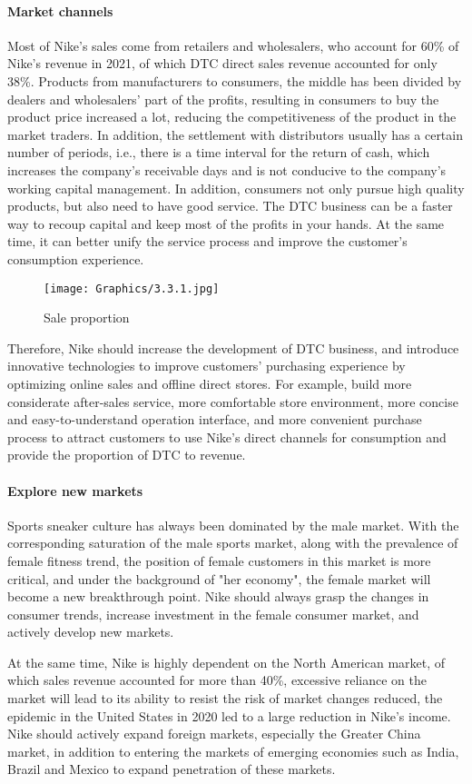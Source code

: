 \documentclass[a4paper, 12pt]{report}
\begin{document}
\paragraph{Market channels}
Most of Nike's sales come from retailers and wholesalers, who account for 60\% of Nike's revenue in 2021, of which DTC direct sales revenue accounted for only 38\%. Products from manufacturers to consumers, the middle has been divided by dealers and wholesalers’ part of the profits, resulting in consumers to buy the product price increased a lot, reducing the competitiveness of the product in the market traders. In addition, the settlement with distributors usually has a certain number of periods, i.e., there is a time interval for the return of cash, which increases the company's receivable days and is not conducive to the company's working capital management. In addition, consumers not only pursue high quality products, but also need to have good service. The DTC business can be a faster way to recoup capital and keep most of the profits in your hands. At the same time, it can better unify the service process and improve the customer's consumption experience. \par
 \begin{figure}[ht]
 			\begin{center}
				\texttt{[image: Graphics/3.3.1.jpg]}
			\end{center}
       		\caption{\label{3.3.1}Sale proportion}
 \end{figure}

Therefore, Nike should increase the development of DTC business, and introduce innovative technologies to improve customers' purchasing experience by optimizing online sales and offline direct stores. For example, build more considerate after-sales service, more comfortable store environment, more concise and easy-to-understand operation interface, and more convenient purchase process to attract customers to use Nike's direct channels for consumption and provide the proportion of DTC to revenue.
\paragraph{Explore new markets}
Sports sneaker culture has always been dominated by the male market. With the corresponding saturation of the male sports market, along with the prevalence of female fitness trend, the position of female customers in this market is more critical, and under the background of "her economy", the female market will become a new breakthrough point. Nike should always grasp the changes in consumer trends, increase investment in the female consumer market, and actively develop new markets.\par
At the same time, Nike is highly dependent on the North American market, of which sales revenue accounted for more than 40\%, excessive reliance on the market will lead to its ability to resist the risk of market changes reduced, the epidemic in the United States in 2020 led to a large reduction in Nike's income. Nike should actively expand foreign markets, especially the Greater China market, in addition to entering the markets of emerging economies such as India, Brazil and Mexico to expand penetration of these markets.
\end{document}
